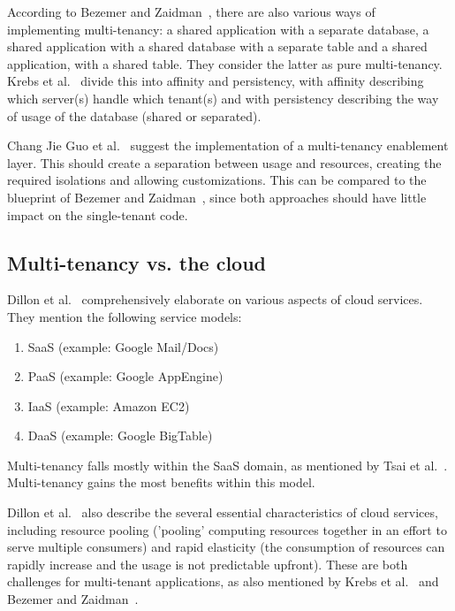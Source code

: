According to Bezemer and Zaidman~\cite{bezemer2010multi}, there are also various ways of implementing multi-tenancy: a shared application with a separate database, a shared application with a shared database with a separate table and a shared application, with a shared table. They consider the latter as pure multi-tenancy. Krebs et al.~\cite{krebs2012architecture} divide this into affinity and persistency, with affinity describing which server(s) handle which tenant(s) and with persistency describing the way of usage of the database (shared or separated).

Chang Jie Guo et al.~\cite{guo2007framework} suggest the implementation of a multi-tenancy enablement layer. This should create a separation between usage and resources, creating the required isolations and allowing customizations. This can be compared to the blueprint of Bezemer and Zaidman~\cite{bezemer2010multi}, since both approaches should have little impact on the single-tenant code.

\subsection{Multi-tenancy vs. the cloud}

Dillon et al.~\cite{dillon2010cloud} comprehensively elaborate on various aspects of cloud services. They mention the following service models: 
\begin{enumerate}
\item \acf{SaaS} (example: Google Mail/Docs)
\item \acf{PaaS} (example: Google AppEngine)
\item \acf{IaaS} (example: Amazon EC2)
\item \acf{DaaS} (example: Google BigTable)
\end{enumerate}

Multi-tenancy falls mostly within the \ac{SaaS} domain, as mentioned by Tsai et al.~\cite{tsai2010towards}. Multi-tenancy gains the most benefits within this model.

Dillon et al.~\cite{dillon2010cloud} also describe the several essential characteristics of cloud services, including resource pooling ('pooling' computing resources together in an effort to serve multiple consumers) and rapid elasticity (the consumption of resources can rapidly increase and the usage is not predictable upfront). These are both challenges for multi-tenant applications, as also mentioned by Krebs et al.~\cite{krebs2012architecture} and Bezemer and Zaidman~\cite{bezemer2010multi}.

